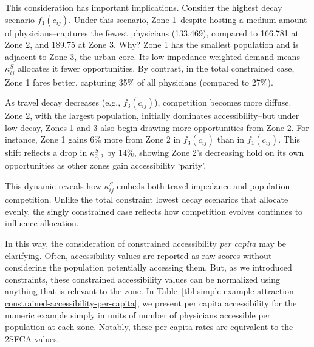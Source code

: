 \documentclass[
  10pt,
  letterpaper,
]{article}
\begin{document}
This consideration has important implications. Consider the highest
decay scenario \(f_1(c_{ij})\). Under this scenario, Zone 1--despite
hosting a medium amount of physicians--captures the fewest physicians
(133.469), compared to 166.781 at Zone 2, and 189.75 at Zone 3. Why?
Zone 1 has the smallest population and is adjacent to Zone 3, the urban
core. Its low impedance-weighted demand means \(\kappa^S_{ij}\)
allocates it fewer opportunities. By contrast, in the total constrained
case, Zone 1 fares better, capturing 35\% of all physicians (compared to
27\%).

As travel decay decreases (e.g., \(f_3(c_{ij})\)), competition becomes
more diffuse. Zone 2, with the largest population, initially dominates
accessibility--but under low decay, Zones 1 and 3 also begin drawing
more opportunities from Zone 2. For instance, Zone 1 gains 6\% more from
Zone 2 in \(f_3(c_{ij})\) than in \(f_1(c_{ij})\). This shift reflects a
drop in \(\kappa^S_{2,2}\) by 14\%, showing Zone 2's decreasing hold on
its own opportunities as other zones gain accessibility `parity'.

This dynamic reveals how \(\kappa^S_{ij}\) embeds both travel impedance
and population competition. Unlike the total constraint lowest decay
scenarios that allocate evenly, the singly constrained case reflects how
competition evolves continues to influence allocation.

In this way, the consideration of constrained accessibility \emph{per
capita} may be clarifying. Often, accessibility values are reported as
raw scores without considering the population potentially accessing
them. But, as we introduced constraints, these constrained accessibility
values can be normalized using anything that is relevant to the zone. In
Table~\ref{tbl-simple-example-attraction-constrained-accessibility-per-capita},
we present per capita accessibility for the numeric example simply in
units of number of physicians accessible per population at each zone.
Notably, these per capita rates are equivalent to the 2SFCA values.
\end{document}
